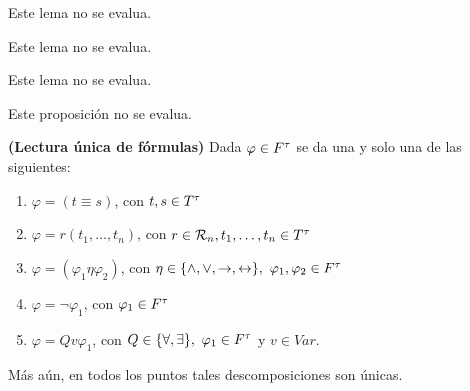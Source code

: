   \begin{lemma}
    \PN Este lema no se evalua.
  \end{lemma}

  \begin{lemma}
    \PN Este lema no se evalua.
  \end{lemma}

  \begin{lemma}
    \PN Este lema no se evalua.
  \end{lemma}

  \begin{proposition}
    \PN Este proposición no se evalua.
  \end{proposition}

  \begin{theorem} \label{lemma_41}
    \PN \textbf{(Lectura única de fórmulas)} Dada $\varphi \in F^{\tau}$ se da una y solo una de las siguientes:
    \begin{enumerate}[(1)]
      \item $\varphi = (t \equiv s)$, con $t, s \in T^{\tau}$
      \item $\varphi = r(t_{1}, \dotsc, t_{n})$, con $r \in \mathcal{R}_{n}, t_{1}, \dotsc, t_{n} \in T^{\tau}$
      \item $\varphi = (\varphi_{1} \eta \varphi_{2})$, con $\eta \in \{\wedge, \vee, \rightarrow, \leftrightarrow\}, \
        \varphi_{1}, \varphi_{2} \in F^{\tau}$
      \item $\varphi = \lnot \varphi_{1}$, con $\varphi_{1} \in F^{\tau}$
      \item $\varphi = Qv \varphi_{1}$, con $Q \in \{\forall, \exists\}, \ \varphi_{1} \in F^{\tau}$ y $v \in Var$.
    \end{enumerate}

    \PN Más aún, en todos los puntos tales descomposiciones son únicas.
  \end{theorem}

